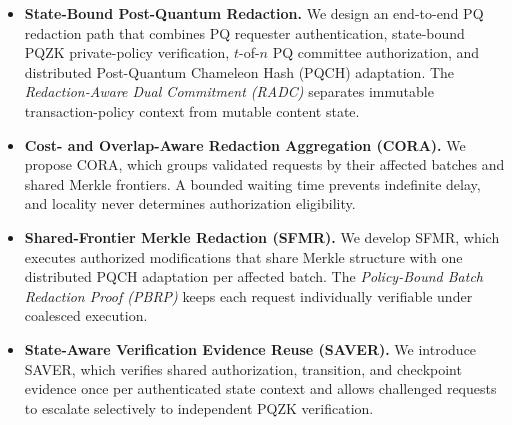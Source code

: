 \documentclass[lettersize,journal]{IEEEtran}
\begin{document}
\begin{itemize}

\item \textbf{State-Bound Post-Quantum Redaction.}
We design an end-to-end PQ redaction path that combines PQ requester
authentication, state-bound PQZK private-policy verification,
$t$-of-$n$ PQ committee authorization, and distributed Post-Quantum
Chameleon Hash (PQCH) adaptation. The \emph{Redaction-Aware Dual
Commitment (RADC)} separates immutable transaction-policy context from
mutable content state.

\item \textbf{Cost- and Overlap-Aware Redaction Aggregation (CORA).}
We propose CORA, which groups validated requests by their affected
batches and shared Merkle frontiers. A bounded waiting time prevents
indefinite delay, and locality never determines authorization
eligibility.

\item \textbf{Shared-Frontier Merkle Redaction (SFMR).}
We develop SFMR, which executes authorized modifications that share
Merkle structure with one distributed PQCH adaptation per affected
batch. The \emph{Policy-Bound Batch Redaction Proof (PBRP)} keeps each
request individually verifiable under coalesced execution.

\item \textbf{State-Aware Verification Evidence Reuse (SAVER).}
We introduce SAVER, which verifies shared authorization, transition, and
checkpoint evidence once per authenticated state context and allows
challenged requests to escalate selectively to independent PQZK
verification.

\end{itemize}
\end{document}
